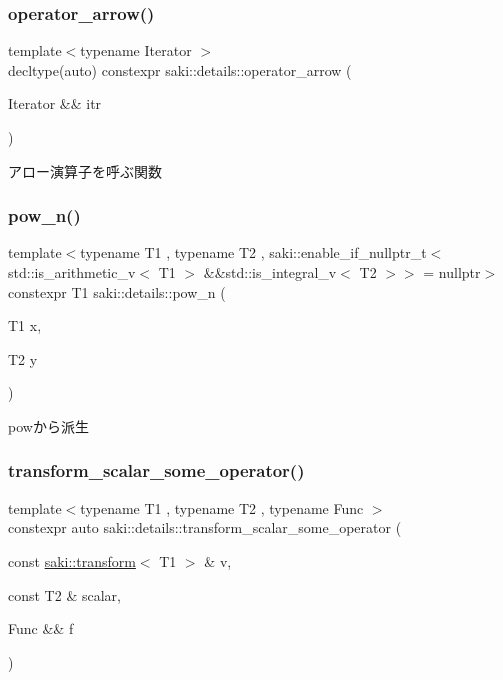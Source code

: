 \subsubsection{\texorpdfstring{operator\+\_\+arrow()}{operator\_arrow()}}
{\footnotesize\ttfamily template$<$typename Iterator $>$ \\
decltype(auto) constexpr saki\+::details\+::operator\+\_\+arrow (\begin{DoxyParamCaption}\item[{Iterator \&\&}]{itr }\end{DoxyParamCaption})}



アロー演算子を呼ぶ関数 

\mbox{\label{namespacesaki_1_1details_a30b4cd78c970618ee2886123c28e4041}} 
\subsubsection{\texorpdfstring{pow\+\_\+n()}{pow\_n()}}
{\footnotesize\ttfamily template$<$typename T1 , typename T2 , saki\+::enable\+\_\+if\+\_\+nullptr\+\_\+t$<$ std\+::is\+\_\+arithmetic\+\_\+v$<$ T1 $>$ \&\&std\+::is\+\_\+integral\+\_\+v$<$ T2 $>$$>$  = nullptr$>$ \\
constexpr T1 saki\+::details\+::pow\+\_\+n (\begin{DoxyParamCaption}\item[{T1}]{x,  }\item[{T2}]{y }\end{DoxyParamCaption})}



powから派生 

\mbox{\label{namespacesaki_1_1details_a28e351f8fafd551dda6ba3cb32e6d0af}} 
\subsubsection{\texorpdfstring{transform\+\_\+scalar\+\_\+some\+\_\+operator()}{transform\_scalar\_some\_operator()}}
{\footnotesize\ttfamily template$<$typename T1 , typename T2 , typename Func $>$ \\
constexpr auto saki\+::details\+::transform\+\_\+scalar\+\_\+some\+\_\+operator (\begin{DoxyParamCaption}\item[{const \mbox{\hyperlink{classsaki_1_1transform}{saki\+::transform}}$<$ T1 $>$ \&}]{v,  }\item[{const T2 \&}]{scalar,  }\item[{Func \&\&}]{f }\end{DoxyParamCaption})}



